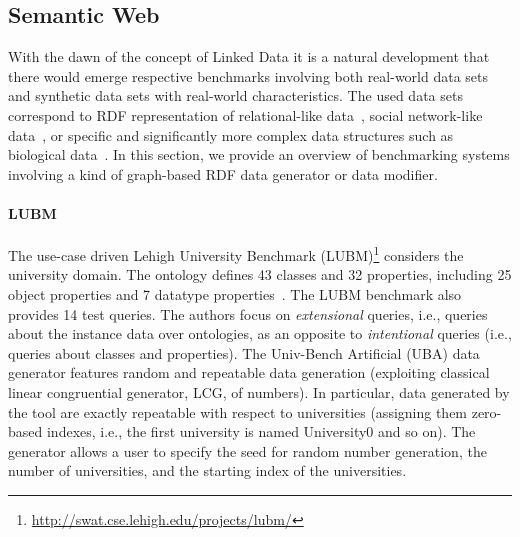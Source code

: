 \subsection{Semantic Web}
\label{sec:generators_LinkedData}
With the dawn of the concept of Linked Data it is a natural development that there would emerge respective benchmarks involving both real-world data sets and synthetic data sets with real-world characteristics. The used data sets correspond to RDF representation of relational-like data~\cite{Guo2005158,Bizer09theberlin}, social network-like data~\cite{Schmidt2010}, or specific and significantly more complex data structures such as biological data~\cite{Wu2014}. In this section, we provide an overview of benchmarking systems involving a kind of graph-based RDF data generator or data modifier. %

\iffalse
Considering the Big Data world, the Linked Data in general definitely belong to this group since we assume that the Linked (Open) Data Sets form a common Linked Open Data cloud\footnote{\url{http://lod-cloud.net/}}. On the other hand, the particular data sets can be relatively small.
\fi

\paragraph{LUBM} The use-case driven Lehigh University Benchmark (LUBM)\footnote{\url{http://swat.cse.lehigh.edu/projects/lubm/}} considers the university domain. The ontology defines 43 classes and 32 properties, including 25 object properties and 7 datatype properties~\cite{Guo2005158}. The LUBM benchmark also provides 14 test queries. The authors focus on \emph{extensional} queries, i.e., queries about the instance data over ontologies, as an opposite to \emph{intentional} queries (i.e., queries about classes and properties). The Univ-Bench Artificial  (UBA) data generator features random and repeatable data generation (exploiting classical linear congruential generator, LCG, of numbers). In particular, data generated by the tool are exactly repeatable with respect to universities (assigning them zero-based indexes, i.e., the first university is named University0 and so on).  The generator allows a user to specify the seed for random number generation, the number of universities, and the starting index of the universities.

